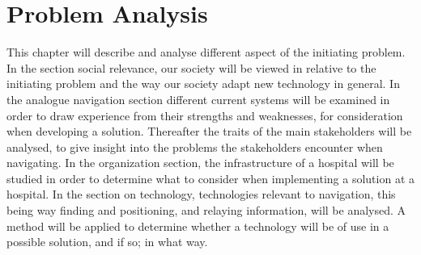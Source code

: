 \chapter{Problem Analysis} \label{cha:problem_analysis}
This chapter will describe and analyse different aspect of the initiating problem. In the section social relevance, our society will be viewed in relative to the initiating problem and the way our society adapt new technology in general. In the analogue navigation section different current systems will be examined in order to draw experience from their strengths and weaknesses, for consideration when developing a solution. Thereafter the traits of the main stakeholders will be analysed, to give insight into the problems the stakeholders encounter when navigating. In the organization section, the infrastructure of a hospital will be studied in order to determine what to consider when implementing a solution at a hospital. In the section on technology, technologies relevant to navigation, this being way finding and positioning, and relaying information, will be analysed. A method will be applied to determine whether a technology will be of use in a possible solution, and if so; in what way. 












